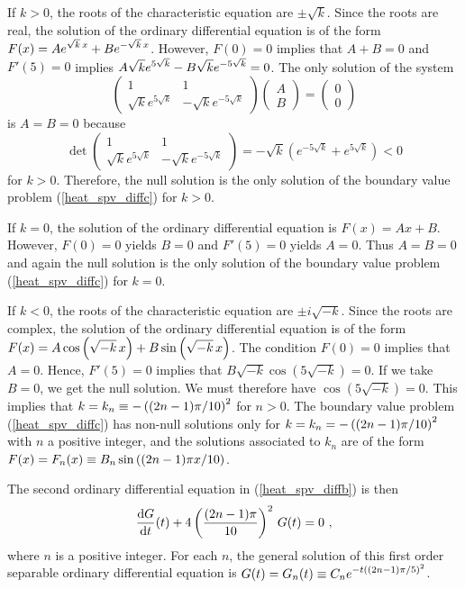 \begin{egg}
If $k>0$, the roots of the characteristic equation are $\pm \sqrt{k}$.
Since the roots are real, the solution of the ordinary differential
equation is of the form
$\displaystyle F(x) = A e^{\sqrt{k}\,x} + B e^{-\sqrt{k}\, x}$.
However, $F(0)=0$ implies that $A+B=0$ and $F'(5)=0$ implies
$\displaystyle A \sqrt{k} e^{5\sqrt{k}} - B \sqrt{k} e^{-5\sqrt{k}} = 0$.
The only solution of the system
\[
\begin{pmatrix}
1 & 1 \\ \sqrt{k} e^{5\sqrt{k}} &-\sqrt{k} e^{-5\sqrt{k}}
\end{pmatrix}
\begin{pmatrix}
A \\ B
\end{pmatrix}
=
\begin{pmatrix}
0 \\ 0 
\end{pmatrix}
\]
is $A=B=0$ because
\[
\det
\begin{pmatrix}
1 & 1 \\ \sqrt{k} e^{5\sqrt{k}} & -\sqrt{k}e^{-5\sqrt{k}}
\end{pmatrix}
= -\sqrt{k} \left(e^{-5\sqrt{k}} + e^{5\sqrt{k}}\right) 
< 0
\]
for $k>0$.  Therefore, the null solution is the only solution
of the boundary value problem (\ref{heat_spv_diffc}) for $k>0$.

If $k=0$, the solution of the ordinary differential equation is $F(x)=Ax+B$.
However, $F(0)=0$ yields $B=0$ and $F'(5)=0$ yields $A = 0$.  Thus
$A=B=0$ and again the null solution is the only solution of the
boundary value problem (\ref{heat_spv_diffc}) for $k=0$.

If $k<0$, the roots of the characteristic equation are $\pm i \sqrt{-k}$.
Since the roots are complex, the solution of the ordinary differential equation is of the form
$\displaystyle
F(x) = A \cos\left(\sqrt{-k}\,x\right) + B \sin\left(\sqrt{-k}\,x\right)$.
The condition $F(0)=0$ implies that $A=0$.  Hence, $F'(5)=0$ implies that
$B \sqrt{-k} \cos\left(5\sqrt{-k}\right) = 0$.  If we take
$B=0$, we get the null solution.  We must therefore have
$\cos\left(5\sqrt{-k}\right) = 0$.  This implies that
$\displaystyle k = k_n \equiv -\left((2n-1)\pi/10\right)^2$ for
$n>0$.  The boundary value problem (\ref{heat_spv_diffc}) has
non-null solutions only for
$\displaystyle k = k_n = -\left((2n-1)\pi/10\right)^2$ with
$n$ a positive integer, and the solutions associated to $k_n$ are of the
form $\displaystyle
F(x)=F_n(x) \equiv B_n \sin\left((2n-1)\pi x/10\right)$.

The second ordinary differential equation in (\ref{heat_spv_diffb}) is then
\[
\frac{\mathrm{d}G}{\mathrm{d}{t}}(t) + 4\left(\frac{(2n-1)\pi}{10}\right)^2\,G(t) = 0 \ ,
\]
where $n$ is a positive integer.  For each $n$, the general solution
of this first order separable ordinary differential equation is
$\displaystyle G(t) = G_n(t) \equiv C_n e^{-t ((2n-1)\pi/5)^2}$.


\end{egg}
